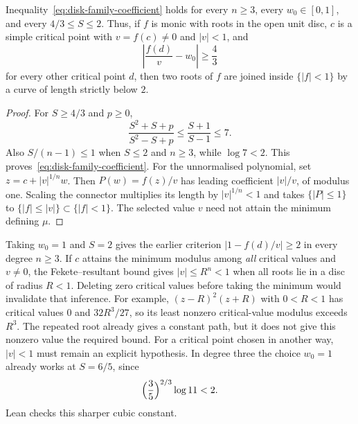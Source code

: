 \begin{remark}
\label{res:critical-value-thresholds}
Inequality~\eqref{eq:disk-family-coefficient} holds for every $n\ge3$,
every $w_0\in[0,1]$, and every $4/3\le S\le2$.  Thus, if $f$ is monic with
roots in the open unit disc, $c$ is a simple critical point with
$v=f(c)\ne0$ and $|v|<1$, and
\[
 \left|\frac{f(d)}v-w_0\right|\ge\frac43
\]
for every other critical point $d$, then two roots of $f$ are joined inside
$\{|f|<1\}$ by a curve of length strictly below $2$.
\end{remark}


\begin{proof}
For $S\ge4/3$ and $p\ge0$,
\[
 \frac{S^2+S+p}{S^2-S+p}\le\frac{S+1}{S-1}\le7.
\]
Also $S/(n-1)\le1$ when $S\le2$ and $n\ge3$, while $\log7<2$.
This proves~\eqref{eq:disk-family-coefficient}.  For the unnormalised
polynomial, set $z=c+|v|^{1/n}w$. Then $P(w)=f(z)/v$ has leading
coefficient $|v|/v$, of modulus one. Scaling the connector multiplies its
length by $|v|^{1/n}<1$ and takes $\{|P|\le1\}$ to
$\{|f|\le|v|\}\subset\{|f|<1\}$. The selected value $v$ need not attain
the minimum defining $\mu$.
\end{proof}

Taking $w_0=1$ and $S=2$ gives the earlier criterion
$|1-f(d)/v|\ge2$ in every degree $n\ge3$. If $c$ attains the minimum
modulus among \emph{all} critical values and $v\ne0$, the
Fekete--resultant bound gives $|v|\le R^n<1$ when all roots lie in a disc
of radius $R<1$. Deleting zero critical values before taking the minimum
would invalidate that inference. For example, $(z-R)^2(z+R)$ with $0<R<1$ has critical
values $0$ and $32R^3/27$, so its least nonzero critical-value modulus
exceeds $R^3$. The repeated root already gives a constant path, but it
does not give this nonzero value the required bound. For a critical point
chosen in another way, $|v|<1$ must remain an explicit hypothesis.
In degree three the choice $w_0=1$ already works at
$S=6/5$, since
\[
 \Bigl(\frac35\Bigr)^{2/3}\log 11<2.
\]
Lean checks this sharper cubic constant.

